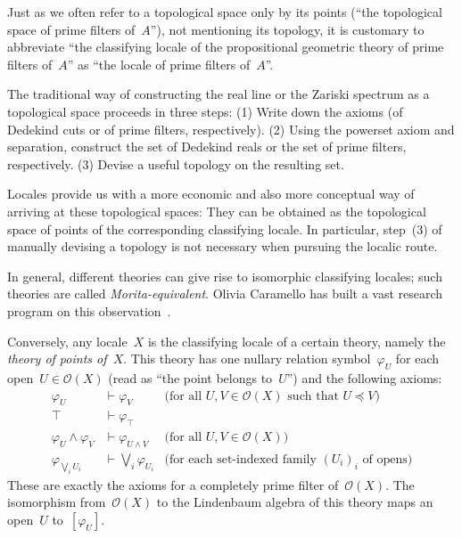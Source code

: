 \documentclass{ws-rv9x6}
\renewcommand{\O}{\mathcal{O}}
\renewcommand{\_}{\mathpunct{.}}
\newcommand{\?}{\,{:}\,}
\begin{document}
Just as we often refer to a topological space only by its points (``the
topological space of prime filters of~$A$''), not mentioning its topology, it is
customary to abbreviate ``the classifying locale of the propositional geometric
theory of prime filters of~$A$'' as ``the locale of prime filters of~$A$''.

\begin{remark}\label{rem:traditional-spaces}
The traditional way of constructing the real line or the Zariski
spectrum as a topological space proceeds in three steps: (1) Write down the
axioms (of Dedekind cuts or of prime filters, respectively). (2) Using the powerset
axiom and separation, construct the set of Dedekind reals or the set
of prime filters, respectively. (3) Devise a useful topology on the resulting set.

Locales provide us with a more economic and also more conceptual way of
arriving at these topological spaces: They can be obtained as the topological
space of points of the corresponding classifying locale. In particular,
step~(3) of manually devising a topology is not necessary when pursuing the
localic route.
\end{remark}

In general, different theories can give rise to isomorphic classifying locales;
such theories are called \emph{Morita-equivalent}. Olivia Caramello has built a vast research program
on this observation~\cite{caramello:tst}.

Conversely, any locale~$X$ is the classifying locale of a certain theory, namely
the \emph{theory of points of~$X$}. This theory has one nullary relation
symbol~$\varphi_U$ for each open~$U \in \O(X)$ (read as ``the point belongs
to~$U$'') and the following axioms:
\begin{align*}
  \varphi_U &\vdash \varphi_V & \text{(for all~$U,V \in \O(X)$ such that~$U \preceq V$)} \\
  \top &\vdash \varphi_\top \\
  \varphi_U \wedge \varphi_V &\vdash \varphi_{U \wedge V} & \text{(for all~$U,V \in \O(X)$)} \\
  \varphi_{\bigvee_i U_i} &\vdash \bigvee_i \varphi_{U_i} & \text{(for each set-indexed family~$(U_i)_i$ of opens)}
\end{align*}
These are exactly the axioms for a completely prime filter of~$\O(X)$. The
isomorphism from~$\O(X)$ to the Lindenbaum algebra of this theory maps an
open~$U$ to~$[\varphi_U]$.
\end{document}
